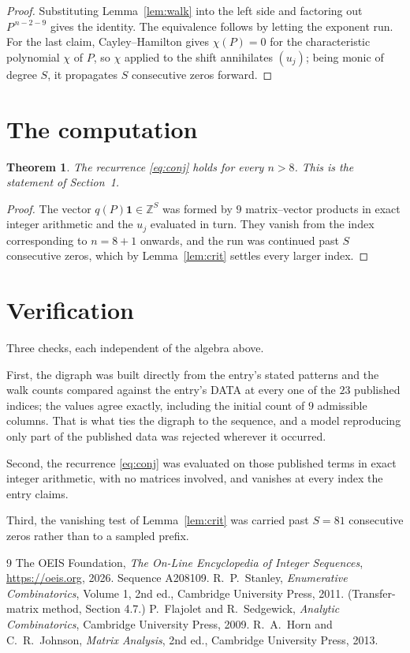 \documentclass[11pt,a4paper]{article}
\theoremstyle{plain}
\newtheorem{theorem}{Theorem}
\theoremstyle{definition}
\begin{document}
\begin{proof}
Substituting Lemma~\ref{lem:walk} into the left side and factoring out
$P^{\,n-2-9}$ gives the identity. The equivalence follows by letting the exponent
run. For the last claim, Cayley--Hamilton gives $\chi(P)=0$ for the characteristic
polynomial $\chi$ of $P$, so $\chi$ applied to the shift annihilates $(u_j)$; being monic of
degree $S$, it propagates $S$ consecutive zeros forward.
\end{proof}

\section{The computation}

\begin{theorem}
The recurrence \eqref{eq:conj} holds for every $n>8$. This is the statement of
Section~1.
\end{theorem}

\begin{proof}
The vector $q(P)\mathbf{1}\in\mathbb{Z}^{S}$ was formed by $9$ matrix--vector
products in exact integer arithmetic and the $u_j$ evaluated in turn. They vanish from the
index corresponding to $n=8+1$ onwards, and the run was continued past $S$ consecutive
zeros, which by Lemma~\ref{lem:crit} settles every larger index.
\end{proof}

\section{Verification}

Three checks, each independent of the algebra above.

First, the digraph was built directly from the entry's stated patterns and the walk counts
compared against the entry's DATA at every one of the $23$ published indices; the
values agree exactly, including the initial count of $9$ admissible columns. That is
what ties the digraph to the sequence, and a model reproducing only part of the published
data was rejected wherever it occurred.

Second, the recurrence \eqref{eq:conj} was evaluated on those published terms in exact
integer arithmetic, with no matrices involved, and vanishes at every index the entry claims.

Third, the vanishing test of Lemma~\ref{lem:crit} was carried past $S=81$ consecutive
zeros rather than to a sampled prefix.

\begin{thebibliography}{9}
 The OEIS Foundation, \emph{The On-Line Encyclopedia of Integer
Sequences}, \url{https://oeis.org}, 2026. Sequence A208109.
 R.~P.~Stanley, \emph{Enumerative Combinatorics}, Volume 1, 2nd ed.,
Cambridge University Press, 2011. (Transfer-matrix method, Section 4.7.)
 P.~Flajolet and R.~Sedgewick, \emph{Analytic Combinatorics}, Cambridge
University Press, 2009.
 R.~A.~Horn and C.~R.~Johnson, \emph{Matrix Analysis}, 2nd ed., Cambridge
University Press, 2013.
\end{thebibliography}
\end{document}
